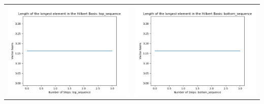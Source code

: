 \documentclass[10pt]{article}
\begin{document}
\begin{tabular}{c|c}
\begin{minipage}{.4\textwidth}
\includegraphics[width=\textwidth]{"DATA/4d/4 generators 2 bound C/top_sequence LENGTH"}
\end{minipage} &
\begin{minipage}{.4\textwidth}
\includegraphics[width=\textwidth]{"DATA/4d/4 generators 2 bound C bottomup/bottom_sequence LENGTH"}
\end{minipage}
\end{tabular}
\end{document}
